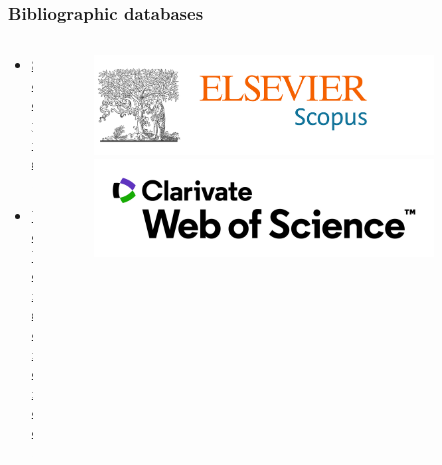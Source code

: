 \documentclass[aspectratio=169]{beamer}
\begin{document}
\begin{frame}
	\frametitle{Bibliographic databases}
	\begin{columns}
		\begin{column}{0.5\textwidth}
			\begin{itemize}
				\item \href{https://www.scopus.com}{Scopus}.
				\item \href{https://www.webofknowledge.com}{Web of science}.
			\end{itemize}
		\end{column}
		\begin{column}{0.5\textwidth}
			\begin{figure}
				\centering
				\includegraphics[width=0.9\textwidth]{logos/scopus.png}\newline
				\includegraphics[width=0.9\textwidth]{logos/wos.png}
			\end{figure}
		\end{column}
	\end{columns}
\end{frame}
\end{document}
